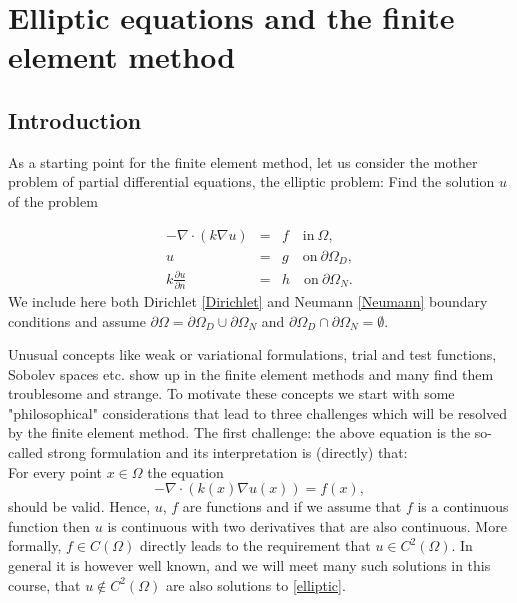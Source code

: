 \chapter{Elliptic equations and the finite element method}




\label{elliptic}
\section{Introduction}

As a starting point for the finite element method, let us
consider the mother problem of partial differential equations, 
the elliptic problem: Find the solution $u$ of the problem

\begin{eqnarray}
\label{elliptic}
-\nabla\cdot(k\nabla u)  &=& f \quad \textrm{in}\ \Omega,\\
\label{Dirichlet}
u&=& g \quad \textrm{on}\ \partial\Omega_D, \\
\label{Neumann}
k \frac{\partial u}{\partial n}&=& h \quad \textrm{on}\ \partial\Omega_N . 
\end{eqnarray}
We include here both Dirichlet \eqref{Dirichlet} and Neumann \eqref{Neumann} boundary conditions
and assume $\partial \Omega = \partial \Omega_D \cup \partial \Omega_N$ 
and $\partial \Omega_D \cap \partial \Omega_N = \emptyset$.
 

Unusual concepts like weak or variational formulations, trial and test functions, Sobolev
spaces etc. show up in the finite element methods and many find them troublesome and strange. To motivate
these concepts we start with some "philosophical" considerations that lead to three challenges which 
will be resolved by the finite element method. The first challenge: the above equation is 
the so-called strong formulation and its interpretation is (directly) that: \\ 
For every point $x \in \Omega$ the equation 
\begin{equation}
\label{strong:elliptic}
-\nabla\cdot(k(x) \nabla u(x))  = f(x),  
\end{equation}
should be valid. Hence, $u$, $f$ are functions and
if we assume that $f$ is a continuous function then $u$ is continuous with two derivatives that are also continuous.   
More formally, $f\in C(\Omega)$ directly leads to the requirement that $u\in C^2(\Omega)$. In general 
it is however well known, and we will meet many such solutions in this course, that $u \not \in C^2(\Omega)$ are also
solutions to \eqref{elliptic}. 



